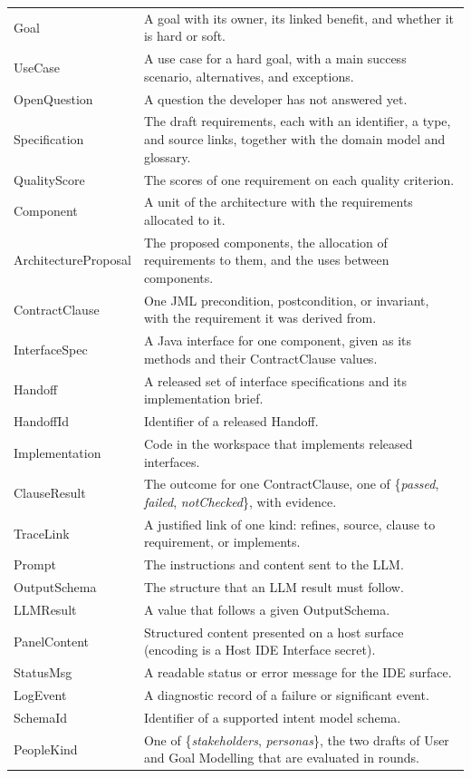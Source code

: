 \documentclass[12pt, titlepage]{article}
\begin{document}
{\begin{longtable}{l p{10.5cm}}
Goal & A goal with its owner, its linked benefit, and whether it is hard or
soft.\\
UseCase & A use case for a hard goal, with a main success scenario,
alternatives, and exceptions.\\
OpenQuestion & A question the developer has not answered yet.\\
Specification & The draft requirements, each with an identifier, a type, and
source links, together with the domain model and glossary.\\
QualityScore & The scores of one requirement on each quality criterion.\\
Component & A unit of the architecture with the requirements allocated to it.\\
ArchitectureProposal & The proposed components, the allocation of requirements to
them, and the uses between components.\\
ContractClause & One JML precondition, postcondition, or invariant, with the
requirement it was derived from.\\
InterfaceSpec & A Java interface for one component, given as its methods and
their ContractClause values.\\
Handoff & A released set of interface specifications and its implementation
brief.\\
HandoffId & Identifier of a released Handoff.\\
Implementation & Code in the workspace that implements released interfaces.\\
ClauseResult & The outcome for one ContractClause, one of \{\textit{passed},
\textit{failed}, \textit{notChecked}\}, with evidence.\\
TraceLink & A justified link of one kind: refines, source, clause to
requirement, or implements.\\
Prompt & The instructions and content sent to the LLM.\\
OutputSchema & The structure that an LLM result must follow.\\
LLMResult & A value that follows a given OutputSchema.\\
PanelContent & Structured content presented on a host surface (encoding is a
Host IDE Interface secret).\\
StatusMsg & A readable status or error message for the IDE surface.\\
LogEvent & A diagnostic record of a failure or significant event.\\
SchemaId & Identifier of a supported intent model schema.\\
PeopleKind & One of \{\textit{stakeholders}, \textit{personas}\}, the two
drafts of User and Goal Modelling that are evaluated in rounds.\\
\bottomrule
\end{longtable}}
\end{document}
